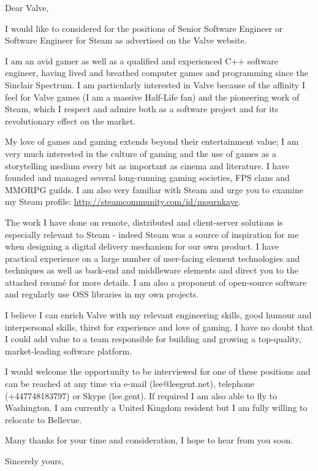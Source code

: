 \documentclass[a4paper]{letter}
\begin{document}
\begin{letter}{}
\opening{Dear Valve,}

I would like to considered for the positions of Senior Software Engineer or Software Engineer for Steam as advertised on the Valve website.

I am an avid gamer as well as a qualified and experienced C++ software engineer, having lived and breathed computer games and programming since the Sinclair Spectrum.  I am particularly interested in Valve because of the affinity I feel for Valve games (I am a massive Half-Life fan) and the pioneering work of Steam, which I respect and admire both as a software project and for its revolutionary effect on the market.

My love of games and gaming extends beyond their entertainment value; I am very much interested in the culture of gaming and the use of games as a storytelling medium every bit as important as cinema and literature.  I have founded and managed several long-running gaming societies, FPS clans and MMORPG guilds.  I am also very familiar with Steam and urge you to examine my Steam profile: \url{http://steamcommunity.com/id/mournkaye}.

The work I have done on remote, distributed and client-server solutions is especially relevant to Steam - indeed Steam was a source of inspiration for me when designing a digital delivery mechanism for our own product.  I have practical experience on a large number of user-facing element technologies and techniques as well as back-end and middleware elements and direct you to the attached resum\'{e} for more details.  I am also a proponent of open-source software and regularly use OSS libraries in my own projects.

I believe I can enrich Valve with my relevant engineering skills, good humour and interpersonal skills, thirst for experience and love of gaming.  I have no doubt that I could add value to a team responsible for building and growing a top-quality, market-leading software platform.

I would welcome the opportunity to be interviewed for one of these positions and can be reached at any time via e-mail (lee@leegent.net), telephone (+447748183797) or Skype (lee.gent).  If required I am also able to fly to Washington.  I am currently a United Kingdom resident but I am fully willing to relocate to Bellevue.

Many thanks for your time and consideration, I hope to hear from you soon.
\closing{Sincerely yours,}
\end{letter}
\end{document}
